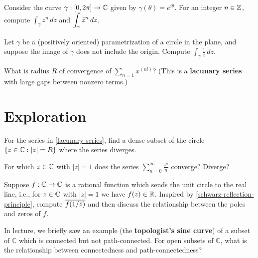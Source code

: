 \documentclass{homework}
\begin{document}
\begin{problem}\label{integral-powers-of-z}Consider the curve $\gamma : [0,2\pi] \to \mathbb{C}$ given by $\gamma(\theta) = e^{i\theta}$.  For an integer $n \in \mathbb{Z}$, compute $\displaystyle\int_\gamma z^n \, dz$ and $\displaystyle\int_\gamma \bar{z}^n \, dz$.
\end{problem}

\begin{problem}\label{one-over-z-around-circle}Let $\gamma$ be a (positively oriented) parametrization of a circle
  in the plane, and suppose the image of $\gamma$ does not include the
  origin.  Compute $\displaystyle\int_\gamma \frac{1}{z} \, dz$.
\end{problem}

\begin{problem}\label{lacunary-series}What is radius $R$ of convergence of
  $\displaystyle\sum_{n=1} x^{(n!)}$?  (This is a \textbf{lacunary
    series} with large gaps between nonzero terms.)
\end{problem}


\section{Exploration}

\begin{problem}For the series in \ref{lacunary-series}, find a dense
  subset of the circle $\{ z \in \mathbb{C} : \left|z\right| = R \}$ where the series
  diverges.
\end{problem}
  
\begin{problem}
  For which $z \in \mathbb{C}$ with $|z|=1$ does the series
  $\displaystyle\sum_{n=0}^{\infty} \frac{z^n}{n}$ converge?  Diverge?
\end{problem}

\begin{problem}Suppose $f : \mathbb{C} \to \mathbb{C}$ is a rational function which
  sends the unit circle to the real line, i.e., for $z \in \mathbb{C}$ with
  $|z| = 1$ we have $f(z) \in \mathbb{R}$.  Inspired
  by \ref{schwarz-reflection-principle}, compute
  $\overline{f(1/\bar{z})}$ and then discuss the relationship between
  the poles and zeros of $f$.
\end{problem}

\begin{problem}In lecture, we briefly saw an example (the
  \textbf{topologist's sine curve}) of a subset of $\mathbb{C}$ which
  is connected but not path-connected.  For open subsets of
  $\mathbb{C}$, what is the relationship between connectedness and
  path-connectedness?
\end{problem}
\end{document}
